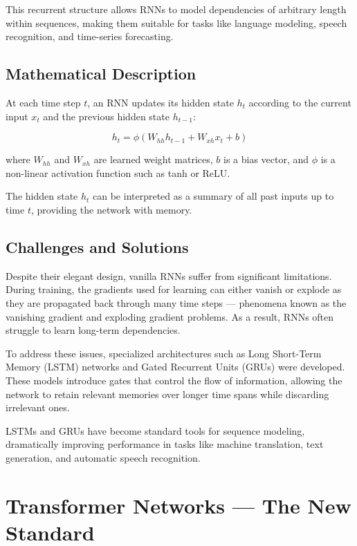 \documentclass{book}
\begin{document}
This recurrent structure allows RNNs to model dependencies of arbitrary length 
within sequences, making them suitable for tasks like language modeling, speech 
recognition, and time-series forecasting.

\subsection{Mathematical Description}

At each time step $t$, an RNN updates its hidden state $h_t$ according to the 
current input $x_t$ and the previous hidden state $h_{t-1}$:

\begin{equation}
h_t = \phi(W_{hh}h_{t-1} + W_{xh}x_t + b)
\end{equation}

where $W_{hh}$ and $W_{xh}$ are learned weight matrices, $b$ is a bias vector, 
and $\phi$ is a non-linear activation function such as tanh or ReLU.

The hidden state $h_t$ can be interpreted as a summary of all past inputs up to 
time $t$, providing the network with memory.

\subsection{Challenges and Solutions}

Despite their elegant design, vanilla RNNs suffer from significant limitations. 
During training, the gradients used for learning can either vanish or explode as 
they are propagated back through many time steps — phenomena known as the 
vanishing gradient and exploding gradient problems. As a result, RNNs often 
struggle to learn long-term dependencies.

To address these issues, specialized architectures such as Long Short-Term 
Memory (LSTM) networks and Gated Recurrent Units (GRUs) were developed. These
models introduce gates that control the flow of information, allowing the 
network to retain relevant memories over longer time spans while discarding 
irrelevant ones.

LSTMs and GRUs have become standard tools for sequence modeling, dramatically 
improving performance in tasks like machine translation, text generation, and 
automatic speech recognition.

\section{Transformer Networks — The New Standard}
\end{document}
